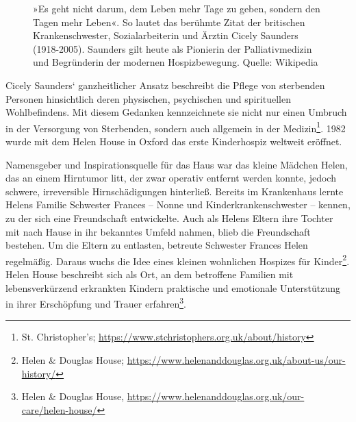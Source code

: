\documentclass[fontsize=14pt,a4paper,headinclude,DIV=calc,automark]{scrbook}
\begin{document}
\setlength{\fboxsep}{0pt}    %
\setlength{\fboxrule}{0.2pt} %
\begin{figure}[ht]
    \center
    \caption{»Es geht nicht darum, dem Leben mehr Tage zu geben, sondern den Tagen mehr Leben«. So lautet das berühmte Zitat der britischen Krankenschwester, Sozialarbeiterin und Ärztin Cicely Saunders (1918-2005). Saunders gilt heute als Pionierin der Palliativmedizin und Begründerin der modernen Hospizbewegung. Quelle: Wikipedia}
    \label{fig:cicely_saunders}
\end{figure}

Cicely Saunders‘ ganzheitlicher Ansatz beschreibt die Pflege von sterbenden Personen hinsichtlich deren physischen, psychischen und spirituellen Wohlbefindens. Mit diesem Gedanken kennzeichnete sie nicht nur einen Umbruch in der Versorgung von Sterbenden, sondern auch allgemein in der Medizin\footnote{St. Christopher’s; \url{https://www.stchristophers.org.uk/about/history}}.
1982 wurde mit dem Helen House in Oxford das erste Kinderhospiz weltweit eröffnet.

Namensgeber und Inspirationsquelle für das Haus war das kleine Mädchen Helen, das an einem Hirntumor litt, der zwar operativ entfernt werden konnte, jedoch schwere, irreversible Hirnschädigungen hinterließ. Bereits im Krankenhaus lernte Helens Familie Schwester Frances – Nonne und Kinderkrankenschwester – kennen, zu der sich eine Freundschaft entwickelte. Auch als Helens Eltern ihre Tochter mit nach Hause in ihr bekanntes Umfeld nahmen, blieb die Freundschaft bestehen. Um die Eltern zu entlasten, betreute Schwester Frances Helen regelmäßig. Daraus wuchs die Idee eines kleinen wohnlichen Hospizes für Kinder\footnote{Helen \& Douglas House; \url{https://www.helenanddouglas.org.uk/about-us/our-history/}}. Helen House beschreibt sich als Ort, an dem betroffene Familien mit lebensverkürzend erkrankten Kindern praktische und emotionale Unterstützung in ihrer Erschöpfung und Trauer erfahren\footnote{Helen \& Douglas House, \url{  https://www.helenanddouglas.org.uk/our-care/helen-house/}}.
\end{document}

